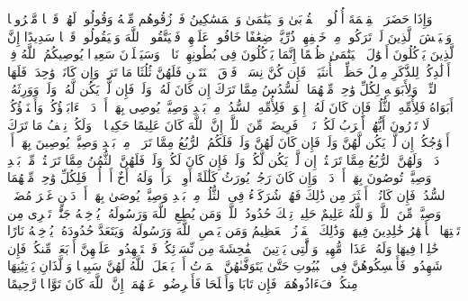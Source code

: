 \startbuffer[\q:4:8]
وَإِذَا حَضَرَ ٱلۡقِسۡمَةَ أُو۟لُوا۟ ٱلۡقُرۡبَىٰ وَٱلۡیَتَٰمَىٰ وَٱلۡمَسَٰكِینُ فَٱرۡزُقُوهُم مِّنۡهُ وَقُولُوا۟ لَهُمۡ قَوۡلࣰا مَّعۡرُوفࣰا%
\stopbuffer%
\startbuffer[\q:4:9]
وَلۡیَخۡشَ ٱلَّذِینَ لَوۡ تَرَكُوا۟ مِنۡ خَلۡفِهِمۡ ذُرِّیَّةࣰ ضِعَٰفًا خَافُوا۟ عَلَیۡهِمۡ فَلۡیَتَّقُوا۟ ٱللَّهَ وَلۡیَقُولُوا۟ قَوۡلࣰا سَدِیدًا%
\stopbuffer%
\startbuffer[\q:4:10]
إِنَّ ٱلَّذِینَ یَأۡكُلُونَ أَمۡوَٰلَ ٱلۡیَتَٰمَىٰ ظُلۡمًا إِنَّمَا یَأۡكُلُونَ فِی بُطُونِهِمۡ نَارࣰاۖ وَسَیَصۡلَوۡنَ سَعِیرࣰا%
\stopbuffer%
\startbuffer[\q:4:11]
یُوصِیكُمُ ٱللَّهُ فِیۤ أَوۡلَٰدِكُمۡۖ لِلذَّكَرِ مِثۡلُ حَظِّ ٱلۡأُنثَیَیۡنِۚ فَإِن كُنَّ نِسَاۤءࣰ فَوۡقَ ٱثۡنَتَیۡنِ فَلَهُنَّ ثُلُثَا مَا تَرَكَۖ وَإِن كَانَتۡ وَٰحِدَةࣰ فَلَهَا ٱلنِّصۡفُۚ وَلِأَبَوَیۡهِ لِكُلِّ وَٰحِدࣲ مِّنۡهُمَا ٱلسُّدُسُ مِمَّا تَرَكَ إِن كَانَ لَهُۥ وَلَدࣱۚ فَإِن لَّمۡ یَكُن لَّهُۥ وَلَدࣱ وَوَرِثَهُۥۤ أَبَوَاهُ فَلِأُمِّهِ ٱلثُّلُثُۚ فَإِن كَانَ لَهُۥۤ إِخۡوَةࣱ فَلِأُمِّهِ ٱلسُّدُسُۚ مِنۢ بَعۡدِ وَصِیَّةࣲ یُوصِی بِهَاۤ أَوۡ دَیۡنٍۗ ءَابَاۤؤُكُمۡ وَأَبۡنَاۤؤُكُمۡ لَا تَدۡرُونَ أَیُّهُمۡ أَقۡرَبُ لَكُمۡ نَفۡعࣰاۚ فَرِیضَةࣰ مِّنَ ٱللَّهِۗ إِنَّ ٱللَّهَ كَانَ عَلِیمًا حَكِیمࣰا%
\stopbuffer%
\startbuffer[\q:4:12]
۞ وَلَكُمۡ نِصۡفُ مَا تَرَكَ أَزۡوَٰجُكُمۡ إِن لَّمۡ یَكُن لَّهُنَّ وَلَدࣱۚ فَإِن كَانَ لَهُنَّ وَلَدࣱ فَلَكُمُ ٱلرُّبُعُ مِمَّا تَرَكۡنَۚ مِنۢ بَعۡدِ وَصِیَّةࣲ یُوصِینَ بِهَاۤ أَوۡ دَیۡنࣲۚ وَلَهُنَّ ٱلرُّبُعُ مِمَّا تَرَكۡتُمۡ إِن لَّمۡ یَكُن لَّكُمۡ وَلَدࣱۚ فَإِن كَانَ لَكُمۡ وَلَدࣱ فَلَهُنَّ ٱلثُّمُنُ مِمَّا تَرَكۡتُمۚ مِّنۢ بَعۡدِ وَصِیَّةࣲ تُوصُونَ بِهَاۤ أَوۡ دَیۡنࣲۗ وَإِن كَانَ رَجُلࣱ یُورَثُ كَلَٰلَةً أَوِ ٱمۡرَأَةࣱ وَلَهُۥۤ أَخٌ أَوۡ أُخۡتࣱ فَلِكُلِّ وَٰحِدࣲ مِّنۡهُمَا ٱلسُّدُسُۚ فَإِن كَانُوۤا۟ أَكۡثَرَ مِن ذَٰلِكَ فَهُمۡ شُرَكَاۤءُ فِی ٱلثُّلُثِۚ مِنۢ بَعۡدِ وَصِیَّةࣲ یُوصَىٰ بِهَاۤ أَوۡ دَیۡنٍ غَیۡرَ مُضَاۤرࣲّۚ وَصِیَّةࣰ مِّنَ ٱللَّهِۗ وَٱللَّهُ عَلِیمٌ حَلِیمࣱ%
\stopbuffer%
\startbuffer[\q:4:13]
تِلۡكَ حُدُودُ ٱللَّهِۚ وَمَن یُطِعِ ٱللَّهَ وَرَسُولَهُۥ یُدۡخِلۡهُ جَنَّٰتࣲ تَجۡرِی مِن تَحۡتِهَا ٱلۡأَنۡهَٰرُ خَٰلِدِینَ فِیهَاۚ وَذَٰلِكَ ٱلۡفَوۡزُ ٱلۡعَظِیمُ%
\stopbuffer%
\startbuffer[\q:4:14]
وَمَن یَعۡصِ ٱللَّهَ وَرَسُولَهُۥ وَیَتَعَدَّ حُدُودَهُۥ یُدۡخِلۡهُ نَارًا خَٰلِدࣰا فِیهَا وَلَهُۥ عَذَابࣱ مُّهِینࣱ%
\stopbuffer%
\startbuffer[\q:4:15]
وَٱلَّٰتِی یَأۡتِینَ ٱلۡفَٰحِشَةَ مِن نِّسَاۤئِكُمۡ فَٱسۡتَشۡهِدُوا۟ عَلَیۡهِنَّ أَرۡبَعَةࣰ مِّنكُمۡۖ فَإِن شَهِدُوا۟ فَأَمۡسِكُوهُنَّ فِی ٱلۡبُیُوتِ حَتَّىٰ یَتَوَفَّىٰهُنَّ ٱلۡمَوۡتُ أَوۡ یَجۡعَلَ ٱللَّهُ لَهُنَّ سَبِیلࣰا%
\stopbuffer%
\startbuffer[\q:4:16]
وَٱلَّذَانِ یَأۡتِیَٰنِهَا مِنكُمۡ فَءَاذُوهُمَاۖ فَإِن تَابَا وَأَصۡلَحَا فَأَعۡرِضُوا۟ عَنۡهُمَاۤۗ إِنَّ ٱللَّهَ كَانَ تَوَّابࣰا رَّحِیمًا%
